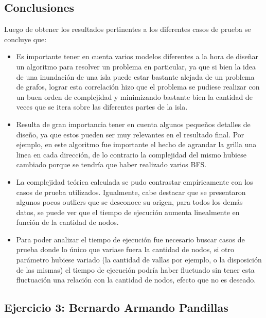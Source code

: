 \documentclass[a4paper, 12pt]{article}
\begin{document}
\subsection*{Conclusiones}
Luego de obtener los resultados pertinentes a los diferentes casos de prueba se concluye que:
\begin{itemize}
\item Es importante tener en cuenta varios modelos diferentes a la hora de dise\~{n}ar un algoritmo para resolver un problema
en particular, ya que si bien la idea de una inundación de una isla puede estar bastante alejada de un problema de grafos, lograr
esta correlación hizo que el problema se pudiese realizar con un buen orden de complejidad y minimizando bastante bien la cantidad de 
veces que se itera sobre las diferentes partes de la isla.
\item Resulta de gran importancia tener en cuenta algunos peque\~{n}os detalles de dise\~{n}o, ya que estos pueden ser muy
relevantes en el resultado final. Por ejemplo, en este algoritmo fue importante el hecho de agrandar la grilla una linea en cada dirección, 
de lo contrario la complejidad del mismo hubiese cambiado porque se tendría que haber realizado varios BFS.
\item La complejidad teórica calculada se pudo contrastar empíricamente con los casos de prueba utilizados. Igualmente, 
cabe destacar que se presentaron algunos pocos outliers que se desconoce su origen, para todos los demás datos, se puede ver que
el tiempo de ejecución aumenta linealmente en función de la cantidad de nodos.
\item Para poder analizar el tiempo de ejecución fue necesario buscar casos de prueba donde lo único que variase fuera la cantidad de nodos,
si otro parámetro hubiese variado (la cantidad de vallas por ejemplo, o la disposición de las mismas) el tiempo de ejecución 
podría haber fluctuado sin tener esta fluctuación una relación con la cantidad de nodos, efecto que no es deseado. 
\end{itemize}


\begin{center}
\item \section*{Ejercicio 3: Bernardo Armando Pandillas}

\end{center}
\end{document}
